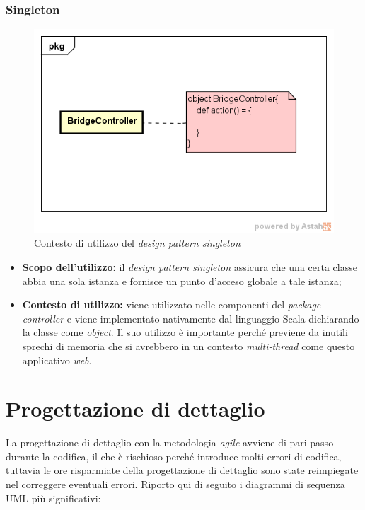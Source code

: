 \subsubsection{Singleton}
\begin{figure}[h]
\centering
\includegraphics[scale=0.50]{immagini/singleton}
\caption{Contesto di utilizzo del \emph{design pattern singleton}}
\label{fig:pattern-singleton}
\end{figure}
\begin{itemize}
\item\textbf{Scopo dell'utilizzo:} il \emph{design pattern singleton} assicura che una certa classe abbia una sola istanza e fornisce un punto d'acceso globale a tale istanza;
\item \textbf{Contesto di utilizzo:} viene utilizzato nelle componenti del \emph{package controller} e viene implementato nativamente dal linguaggio Scala dichiarando la classe come \emph{object}. Il suo utilizzo è importante perché previene da inutili sprechi di memoria che si avrebbero in un contesto \emph{multi-thread} come questo applicativo \emph{web}.
\end{itemize}



\newpage
\section{Progettazione di dettaglio}
La progettazione di dettaglio con la metodologia \emph{agile} avviene di pari passo durante la codifica, il che è rischioso perché introduce molti errori di codifica, tuttavia le ore risparmiate della progettazione di dettaglio sono state reimpiegate nel correggere eventuali errori. Riporto qui di seguito i diagrammi di sequenza UML più significativi:

